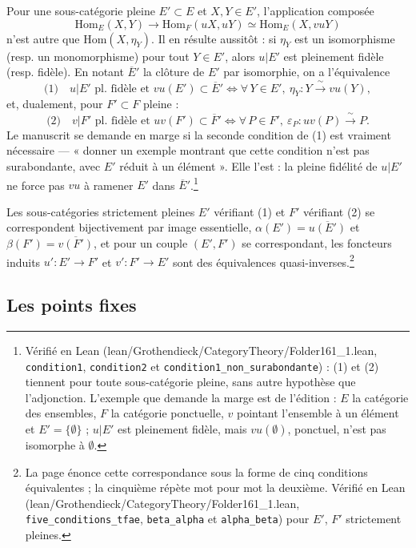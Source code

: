 \documentclass[11pt,a4paper]{article}
\begin{document}
Pour une sous-catégorie pleine $E' \subset E$ et $X, Y \in E'$,
l'application composée
\[
\mathrm{Hom}_E(X, Y) \longrightarrow \mathrm{Hom}_F(uX, uY)
\simeq \mathrm{Hom}_E(X, vuY)
\]
n'est autre que $\mathrm{Hom}(X, \eta_Y)$. Il en résulte aussitôt : si
$\eta_Y$ est un isomorphisme (resp. un monomorphisme) pour tout
$Y \in E'$, alors $u|E'$ est pleinement fidèle (resp. fidèle). En notant
$\overline{E}'$ la clôture de $E'$ par isomorphie, on a l'équivalence
\[
\text{(1)} \quad u|E' \text{ pl. fidèle et } vu(E') \subset \overline{E}'
\iff \forall\, Y \in E',\ \eta_Y : Y \xrightarrow{\ \sim\ } vu(Y),
\]
et, dualement, pour $F' \subset F$ pleine :
\[
\text{(2)} \quad v|F' \text{ pl. fidèle et } uv(F') \subset \overline{F}'
\iff \forall\, P \in F',\ \varepsilon_P : uv(P) \xrightarrow{\ \sim\ } P.
\]
Le manuscrit se demande en marge si la seconde condition de (1) est
vraiment nécessaire — « donner un exemple montrant que cette condition
n'est pas surabondante, avec $E'$ réduit à un élément ». Elle l'est : la
pleine fidélité de $u|E'$ ne force pas $vu$ à ramener $E'$ dans
$\overline{E}'$.\footnote{Vérifié en Lean (lean/Grothendieck/CategoryTheory/Folder161\_1.lean,
\texttt{condition1}, \texttt{condition2} et
\texttt{condition1\_non\_surabondante}) : (1) et (2) tiennent pour toute
sous-catégorie pleine, sans autre hypothèse que l'adjonction. L'exemple que
demande la marge est de l'édition : $E$ la catégorie des ensembles, $F$ la
catégorie ponctuelle, $v$ pointant l'ensemble à un élément et $E' = \{\emptyset\}$ ;
$u|E'$ est pleinement fidèle, mais $vu(\emptyset)$, ponctuel, n'est pas
isomorphe à $\emptyset$.}

Les sous-catégories strictement pleines $E'$ vérifiant (1) et $F'$
vérifiant (2) se correspondent bijectivement par image essentielle,
$\alpha(E') = \overline{u(E')}$ et $\beta(F') = \overline{v(F')}$, et pour
un couple $(E', F')$ se correspondant, les foncteurs induits
$u' : E' \to F'$ et $v' : F' \to E'$ sont des équivalences quasi-inverses.\footnote{La
page énonce cette correspondance sous la forme de cinq conditions
équivalentes ; la cinquième répète mot pour mot la deuxième. Vérifié en Lean
(lean/Grothendieck/CategoryTheory/Folder161\_1.lean, \texttt{five\_conditions\_tfae},
\texttt{beta\_alpha} et \texttt{alpha\_beta}) pour $E'$, $F'$ strictement
pleines.}

\subsection*{Les points fixes}
\end{document}
